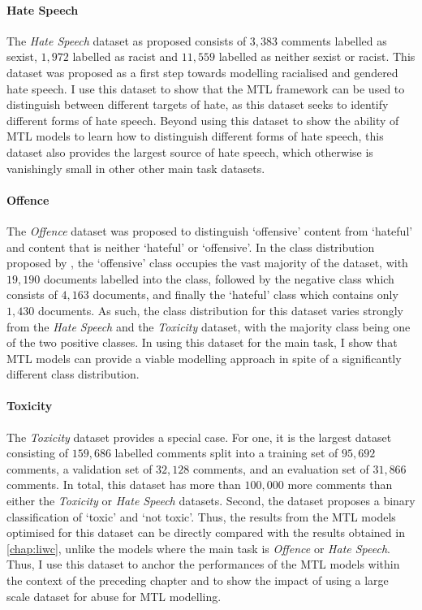\paragraph{Hate Speech}
The \textit{Hate Speech} dataset \citep{Waseem-Hovy:2016} as proposed consists of $3,383$ comments labelled as sexist, $1,972$ labelled as racist and $11,559$ labelled as neither sexist or racist.
This dataset was proposed as a first step towards modelling racialised and gendered hate speech.
I use this dataset to show that the MTL framework can be used to distinguish between different targets of hate, as this dataset seeks to identify different forms of hate speech.
Beyond using this dataset to show the ability of MTL models to learn how to distinguish different forms of hate speech, this dataset also provides the largest source of hate speech, which otherwise is vanishingly small in other other main task datasets.

\paragraph{Offence}
The \textit{Offence} dataset \citep{Davidson:2017} was proposed to distinguish `offensive' content from `hateful' and content that is neither `hateful' or `offensive'.
In the class distribution proposed by \citet{Davidson:2017}, the `offensive' class occupies the vast majority of the dataset, with $19,190$ documents labelled into the class, followed by the negative class which consists of $4,163$ documents, and finally the `hateful' class which contains only $1,430$ documents.
As such, the class distribution for this dataset varies strongly from the \textit{Hate Speech} and the \textit{Toxicity} dataset, with the majority class being one of the two positive classes.
In using this dataset for the main task, I show that MTL models can provide a viable modelling approach in spite of a significantly different class distribution.

\paragraph{Toxicity}
The \textit{Toxicity} dataset \citep{Wulczyn:2017} provides a special case.
For one, it is the largest dataset consisting of $159,686$ labelled comments split into a training set of $95,692$ comments, a validation set of $32,128$ comments, and an evaluation set of $31,866$ comments.
In total, this dataset has more than $100,000$ more comments than either the \textit{Toxicity} or \textit{Hate Speech} datasets.
Second, the dataset proposes a binary classification of `toxic' and `not toxic'.
Thus, the results from the MTL models optimised for this dataset can be directly compared with the results obtained in \cref{chap:liwc}, unlike the models where the main task is \textit{Offence} or \textit{Hate Speech}.
Thus, I use this dataset to anchor the performances of the MTL models within the context of the preceding chapter and to show the impact of using a large scale dataset for abuse for MTL modelling.

